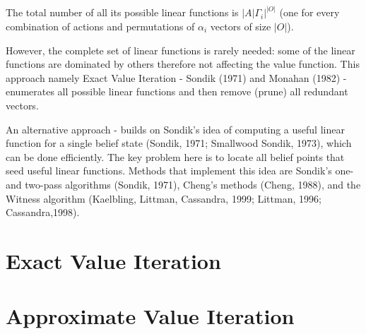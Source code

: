 \documentclass[a4paper,11pt]{report}
\theoremstyle{definition}
\theoremstyle{plain}
\theoremstyle{remark}  %
\begin{document}
The total number of all its possible linear functions is $|A|\Gamma_i|^{|O|}$ (one
for every combination of actions and permutations of $\alpha_i$ vectors of size $|O|$). 

However, the complete set of linear functions is rarely needed: some of the linear functions are 
dominated by others therefore not affecting the value function.
This approach namely Exact Value Iteration - Sondik (1971) and Monahan (1982) - enumerates all possible linear functions
and then remove (prune) all redundant vectors. 


An alternative approach - builds on Sondik's idea of computing a useful linear function for a
single belief state (Sondik, 1971; Smallwood  Sondik, 1973), which can be done efficiently.
The key problem here is to locate all belief points that seed useful linear functions. 
Methods that implement this idea are Sondik's one- and two-pass algorithms (Sondik, 1971), 
Cheng's methods (Cheng, 1988), and the Witness algorithm 
(Kaelbling, Littman,  Cassandra, 1999; Littman, 1996; Cassandra,1998). 

\section{Exact Value Iteration}


\section{Approximate Value Iteration}


\end{document}
